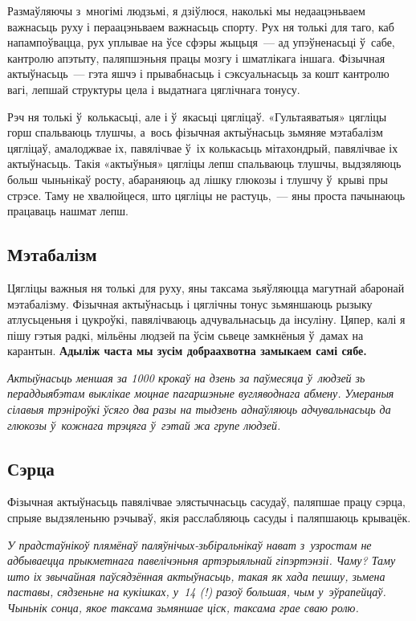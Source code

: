 Размаўляючы з~многімі людзьмі, я дзіўлюся, наколькі мы недаацэньваем важнасьць руху і пераацэньваем важнасьць спорту. Рух ня толькі для таго, каб напампоўвацца, рух уплывае на ўсе сфэры жыцьця~--- ад упэўненасьці ў~сабе, кантролю апэтыту, паляпшэньня працы мозгу і шматлікага іншага. Фізычная актыўнасьць~--- гэта яшчэ і прывабнасьць і сэксуальнасьць за кошт кантролю вагі, лепшай структуры цела і выдатнага цяглічнага тонусу.

Рэч ня толькі ў~колькасьці, але і ў~якасьці цягліцаў. «Гультаяватыя» цягліцы горш спальваюць тлушчы, а~вось фізычная актыўнасьць зьмяняе мэтабалізм цягліцаў, амалоджвае іх, павялічвае ў~іх колькасьць мітахондрый, павялічвае іх актыўнасьць. Такія «актыўныя» цягліцы лепш спальваюць тлушчы, выдзяляюць больш чыньнікаў росту, абараняюць ад лішку глюкозы і тлушчу ў~крыві пры стрэсе. Таму не хвалюйцеся, што цягліцы не растуць,~--- яны проста пачынаюць працаваць нашмат лепш.

\subsection*{Мэтабалізм}

Цягліцы важныя ня толькі для руху, яны таксама зьяўляюцца магутнай абаронай мэтабалізму. Фізычная актыўнасьць і цяглічны тонус зьмяншаюць рызыку атлусьценьня і цукроўкі, павялічваюць адчувальнасьць да інсуліну. Цяпер, калі я пішу гэтыя радкі, мільёны людзей па ўсім сьвеце замкнёныя ў~дамах на карантын. \textbf{Адыліж часта мы зусім добраахвотна замыкаем самі сябе.}

\emph{Актыўнасьць меншая за 1000 крокаў на дзень за паўмесяца ў~людзей зь пераддыябэтам выклікае моцнае пагаршэньне вугляводнага абмену. Умераныя сілавыя трэніроўкі ўсяго два разы на тыдзень аднаўляюць адчувальнасьць да глюкозы ў~кожнага трэцяга ў~гэтай жа групе людзей.}

\subsection*{Сэрца}

Фізычная актыўнасьць павялічвае элястычнасьць сасудаў, паляпшае працу сэрца, спрыяе выдзяленьню рэчываў, якія расслабляюць сасуды і паляпшаюць крывацёк. 

\emph{У прадстаўнікоў плямёнаў паляўнічых-зьбіральнікаў нават з~узростам не адбываецца прыкметнага павелічэньня артэрыяльнай гіпэртэнзіі. Чаму? Таму што іх звычайная паўсядзённая актыўнасьць, такая як хада пешшу, зьмена паставы, сядзеньне на кукішках, у~14 (!) разоў большая, чым у~эўрапейцаў. Чыньнік сонца, якое таксама зьмяншае ціск, таксама грае сваю ролю.}

